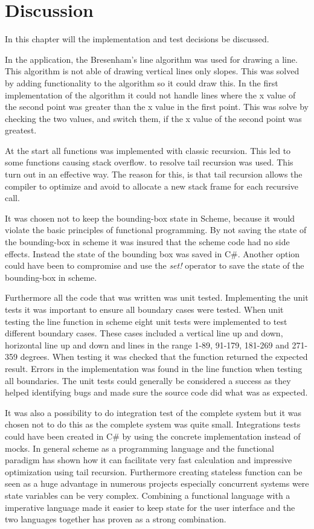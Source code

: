 \chapter{Discussion}
\label{chp:disc}

In this chapter will the implementation and test decisions be discussed. 

In the application, the Bresenham’s line algorithm was used for drawing a line. This algorithm is not able of drawing vertical lines only slopes. This was solved by adding functionality to the algorithm so it could draw this. In the first implementation of the algorithm it could not handle lines where the x value of the second point was greater than the x value in the first point. This was solve by checking the two values, and switch them, if the x value of the second point was greatest.

At the start all functions was implemented with classic recursion. This led to some functions causing stack overflow. to resolve tail recursion was used. This turn out in an effective way. The reason for this, is that tail recursion allows the compiler to optimize and avoid to allocate a new stack frame for each recursive call. 

It was chosen not to keep the bounding-box state in Scheme, because it would violate the basic principles of functional programming. By not saving the state of the bounding-box in scheme it was insured that the scheme code had no side effects. Instead the state of the bounding box was saved in C\#. Another option could have been to compromise and use the \emph{set!} operator to save the state of the bounding-box in scheme.

Furthermore all the code that was written was unit tested. Implementing the unit tests it was important to ensure all boundary cases were tested. When unit testing the line function in scheme eight unit tests were implemented to test different boundary cases. These cases included a vertical line up and down, horizontal line up and down and lines in the range 1-89, 91-179, 181-269 and 271-359 degrees. When testing it was checked that the function returned the expected result. Errors in the implementation was found in the line function when testing all boundaries. The unit tests could generally be considered a success as they helped identifying bugs and made sure the source code did what was as expected.

It was also a possibility to do integration test of the complete system but it was chosen not to do this as the complete system was quite small. Integrations tests could have been created in C\# by using the concrete implementation instead of mocks.
In general scheme as a programming language and the functional paradigm has shown how it can facilitate very fast calculation and impressive optimization using tail recursion. Furthermore creating stateless function can be seen as a huge advantage in numerous projects especially concurrent systems were state variables can be very complex. Combining a functional language with a imperative language made it easier to keep state for the user interface and the two languages together has proven as a strong combination.
